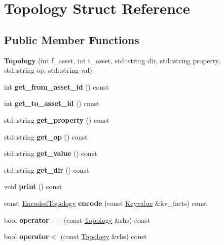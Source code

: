 \hypertarget{class_topology}{}\section{Topology Struct Reference}
\label{class_topology}
\subsection*{Public Member Functions}
\begin{DoxyCompactItemize}
\item 
\mbox{\label{class_topology_a367d6baa1a28bb910ee1e4a5e9efce6f}} 
{\bfseries Topology} (int f\+\_\+asset, int t\+\_\+asset, std\+::string dir, std\+::string property, std\+::string op, std\+::string val)
\item 
\mbox{\label{class_topology_a831312276b8a62f0713c9fce1dfdeec7}} 
int {\bfseries get\+\_\+from\+\_\+asset\+\_\+id} () const
\item 
\mbox{\label{class_topology_a63d4535c6f1f7810b120f7f8dbdb8d00}} 
int {\bfseries get\+\_\+to\+\_\+asset\+\_\+id} () const
\item 
\mbox{\label{class_topology_a6d75d298f9f9d7e7aafaedd8f479251f}} 
std\+::string {\bfseries get\+\_\+property} () const
\item 
\mbox{\label{class_topology_a8da83f454b9886e0eedfd4ea5e82eb46}} 
std\+::string {\bfseries get\+\_\+op} () const
\item 
\mbox{\label{class_topology_a84e1f54ba7ab7826ae0f236293d426d2}} 
std\+::string {\bfseries get\+\_\+value} () const
\item 
\mbox{\label{class_topology_ab36ac813d1685f5bb8138785b2f20b9a}} 
std\+::string {\bfseries get\+\_\+dir} () const
\item 
\mbox{\label{class_topology_a98fb8fa8b2a696a60a78a9ce6e5cb716}} 
void {\bfseries print} () const
\item 
\mbox{\label{class_topology_af4d5d8d0c349f0d9fe421be0d5fa4ff4}} 
const \mbox{\hyperlink{union_encoded_topology}{Encoded\+Topology}} {\bfseries encode} (const \mbox{\hyperlink{class_keyvalue}{Keyvalue}} \&kv\+\_\+facts) const
\item 
\mbox{\label{class_topology_a92d55881f0d66806a1b0a6d895818eb1}} 
bool {\bfseries operator==} (const \mbox{\hyperlink{class_topology}{Topology}} \&rhs) const
\item 
\mbox{\label{class_topology_a504373f784b2364dd868fba9899754db}} 
bool {\bfseries operator$<$} (const \mbox{\hyperlink{class_topology}{Topology}} \&rhs) const
\end{DoxyCompactItemize}
